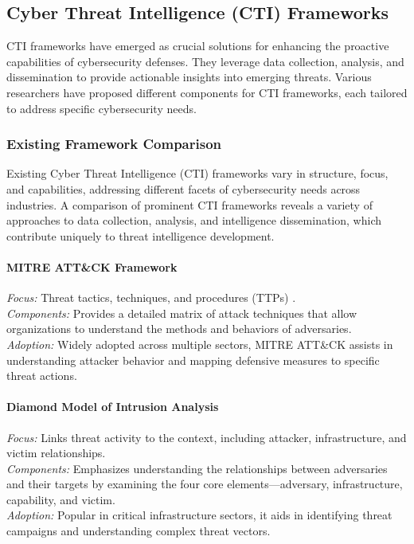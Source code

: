 \documentclass[a4paper,twoside,12pt]{report}
\begin{document}
\subsection{Cyber Threat Intelligence (CTI) Frameworks}
CTI frameworks have emerged as crucial solutions for enhancing the proactive capabilities of cybersecurity defenses. They leverage data collection, analysis, and dissemination to provide actionable insights into emerging threats. Various researchers have proposed different components for CTI frameworks, each tailored to address specific cybersecurity needs.


\subsubsection*{Existing Framework Comparison}
Existing Cyber Threat Intelligence (CTI) frameworks vary in structure, focus, and capabilities, addressing different facets of cybersecurity needs across industries. A comparison of prominent CTI frameworks reveals a variety of approaches to data collection, analysis, and intelligence dissemination, which contribute uniquely to threat intelligence development.

\paragraph{MITRE ATT\&CK Framework \citet{georgiadou2021assessing}}
\textit{Focus:} Threat tactics, techniques, and procedures (TTPs) \citet{shahi2018tactics}. \\
\textit{Components:} Provides a detailed matrix of attack techniques that allow organizations to understand the methods and behaviors of adversaries. \\
\textit{Adoption:} Widely adopted across multiple sectors, MITRE ATT\&CK assists in understanding attacker behavior and mapping defensive measures to specific threat actions.

\paragraph{Diamond Model of Intrusion Analysis \citet{caltagirone2013diamond}}
\textit{Focus:} Links threat activity to the context, including attacker, infrastructure, and victim relationships. \\
\textit{Components:} Emphasizes understanding the relationships between adversaries and their targets by examining the four core elements—adversary, infrastructure, capability, and victim. \\
\textit{Adoption:} Popular in critical infrastructure sectors, it aids in identifying threat campaigns and understanding complex threat vectors.
\end{document}
